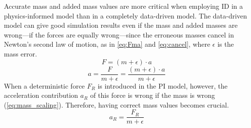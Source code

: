 Accurate mass and added mass values are more critical when employing ID in a physics-informed model than in a completely data-driven model.
The data-driven model can give good simulation results even if the mass and added masses are wrong---if the forces are equally wrong---since the erroneous masses cancel in Newton's second law of motion, as in \autoref{eq:Fma} and \autoref{eq:cancel}, where $\epsilon$ is the mass error.
\begin{equation}
    \label{eq:Fma}
    F = (m+\epsilon) \cdot a
\end{equation}
\begin{equation}
    \label{eq:cancel}
    a = \frac{F}{m+\epsilon} = \frac{(m+\epsilon) \cdot a}{m+\epsilon}
\end{equation}
When a deterministic force $F_R$ is introduced in the PI model, however, the acceleration contribution $a_R$ of this force is wrong if the mass is wrong (\autoref{eq:mass_scaling}). Therefore, having correct mass values becomes crucial.
\begin{equation}
    \label{eq:mass_scaling}
    a_R = \frac{F_R}{m+\epsilon}
\end{equation}